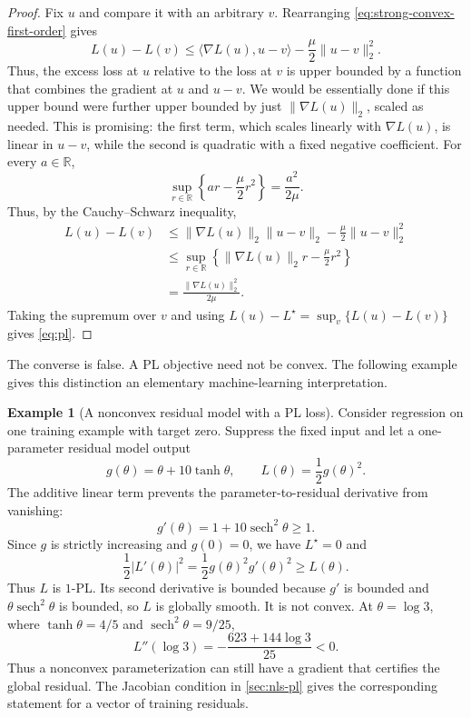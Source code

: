 \documentclass[11pt,twoside]{article}
\newcommand{\R}{\mathbb R}
\theoremstyle{definition}
\newtheorem{example}[theorem]{Example}
\theoremstyle{remark}
\begin{document}
\begin{proof}
Fix $u$ and compare it with an arbitrary $v$. Rearranging
\cref{eq:strong-convex-first-order} gives
\[
 L(u)-L(v)
 \le \langle\nabla L(u),u-v\rangle
       -\frac\mu2\|u-v\|_2^2.
\]
Thus, the excess loss at $u$ relative to the loss at $v$ is upper bounded
by a function that combines the gradient at $u$ and $u-v$. We would be
essentially done if this upper bound were further upper bounded by just
$\|\nabla L(u)\|_2$, scaled as needed. This is promising: the first term,
which scales linearly with $\nabla L(u)$, is linear in $u-v$, while the
second is quadratic with a fixed negative coefficient.
For every $a\in\R$,
\[
 \sup_{r\in\R}\left\{ar-\frac\mu2r^2\right\}
 =\frac{a^2}{2\mu}.
\]
Thus, by the Cauchy--Schwarz inequality,
\begin{align*}
 L(u)-L(v)
 &\le \|\nabla L(u)\|_2\|u-v\|_2
       -\frac\mu2\|u-v\|_2^2\\
 &\le \sup_{r\in\R}
       \left\{\|\nabla L(u)\|_2r-\frac\mu2r^2\right\}\\
 &=\frac{\|\nabla L(u)\|_2^2}{2\mu}.
\end{align*}
Taking the supremum over $v$ and using
$L(u)-L^\star=\sup_v\{L(u)-L(v)\}$ gives \cref{eq:pl}.
\end{proof}

The converse is false. A PL objective need not be convex. The following
example gives this distinction an elementary machine-learning
interpretation.

\begin{example}[A nonconvex residual model with a PL loss]
\label{ex:nonconvex-pl}
Consider regression on one training example with target zero. Suppress the
fixed input and let a one-parameter residual model output
\[
 g(\theta)=\theta+10\tanh\theta,
 \qquad
 L(\theta)=\frac12g(\theta)^2.
\]
The additive linear term prevents the parameter-to-residual derivative from
vanishing:
\[
 g'(\theta)=1+10\operatorname{sech}^2\theta\ge1.
\]
Since $g$ is strictly increasing and $g(0)=0$, we have $L^\star=0$ and
\[
 \frac12|L'(\theta)|^2
 =\frac12g(\theta)^2g'(\theta)^2
 \ge L(\theta).
\]
Thus $L$ is $1$-PL. Its second derivative is bounded because $g'$ is bounded
and $\theta\operatorname{sech}^2\theta$ is bounded, so $L$ is globally
smooth. It is not convex. At $\theta=\log3$, where
$\tanh\theta=4/5$ and $\operatorname{sech}^2\theta=9/25$,
\[
 L''(\log3)
 =-\frac{623+144\log3}{25}<0.
\]
Thus a nonconvex parameterization can still have a gradient that certifies
the global residual. The Jacobian condition in
\cref{sec:nls-pl} gives the corresponding statement for a vector of training
residuals.
\end{example}
\end{document}
